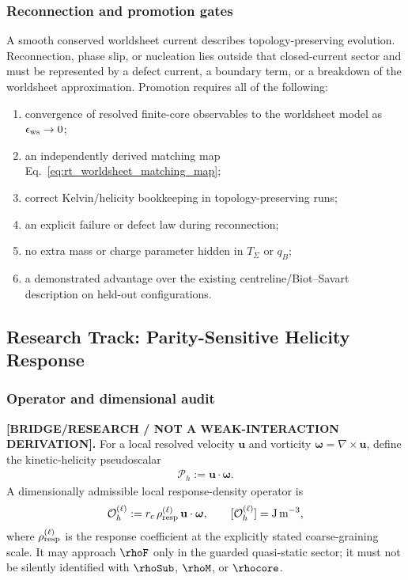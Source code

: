 \subsubsection{Reconnection and promotion gates}

A smooth conserved worldsheet current describes topology-preserving evolution.
Reconnection, phase slip, or nucleation lies outside that closed-current sector
and must be represented by a defect current, a boundary term, or a breakdown of
the worldsheet approximation.  Promotion requires all of the following:
\begin{enumerate}
    \item convergence of resolved finite-core observables to the worldsheet model
    as \(\epsilon_{\rm ws}\to0\);
    \item an independently derived matching map
    Eq.~\eqref{eq:rt_worldsheet_matching_map};
    \item correct Kelvin/helicity bookkeeping in topology-preserving runs;
    \item an explicit failure or defect law during reconnection;
    \item no extra mass or charge parameter hidden in \(T_\Sigma\) or \(q_B\);
    \item a demonstrated advantage over the existing centreline/Biot--Savart
    description on held-out configurations.
\end{enumerate}

\subsection{Research Track: Parity-Sensitive Helicity Response}
\label{sec:rt_parity_sensitive_helicity_response}

\subsubsection{Operator and dimensional audit}

\textbf{[BRIDGE/RESEARCH / NOT A WEAK-INTERACTION DERIVATION].}
For a local resolved velocity \(\mathbf u\) and vorticity
\(\boldsymbol\omega=\nabla\times\mathbf u\), define the kinetic-helicity
pseudoscalar
\begin{align}
    \mathcal P_h
    :=
    \mathbf u\cdot\boldsymbol\omega.
    \label{eq:rt_kinetic_helicity_pseudoscalar}
\end{align}
A dimensionally admissible local response-density operator is
\begin{align}
    \mathcal O_h^{(\ell)}
    :=
    r_c\,\rho_{\rm resp}^{(\ell)}\,
    \mathbf u\cdot\boldsymbol\omega,
    \qquad
    [\mathcal O_h^{(\ell)}]=\mathrm{J\,m^{-3}},
    \label{eq:rt_helicity_response_operator}
\end{align}
where \(\rho_{\rm resp}^{(\ell)}\) is the response coefficient at the explicitly
stated coarse-graining scale.  It may approach \(\rhoF\) only in the guarded
quasi-static sector; it must not be silently identified with \(\rhoSub\),
\(\rhoM\), or \(\rhocore\).

